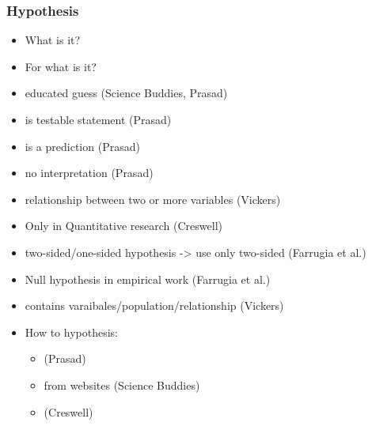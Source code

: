 \subsubsection{Hypothesis}

\begin{itemize}
	\item What is it?
	\item For what is it?
	\item educated guess {\color{red} (Science Buddies, Prasad)}
	\item is testable statement  {\color{red} (Prasad)}
	\item is a prediction {\color{red} (Prasad)}
	\item no interpretation {\color{red}(Prasad)}
	\item relationship between two or more variables {\color{red} (Vickers)}
	\item Only in Quantitative research  {\color{red} (Creswell)}
	\item two-sided/one-sided hypothesis -> use only two-sided  {\color{red} (Farrugia et al.)}
	\item Null hypothesis in empirical work  {\color{red} (Farrugia et al.)}
	\item contains varaibales/population/relationship  {\color{red} (Vickers)}
	\item How to hypothesis:
	\begin{itemize}
		\item  {\color{red} (Prasad)}
		\item from websites  {\color{red} (Science Buddies)}
		\item  {\color{red} (Creswell)}
	\end{itemize}
\end{itemize}